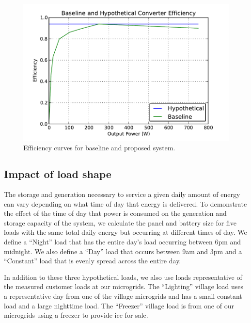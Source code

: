 \documentclass[conference]{IEEEtran}
\begin{document}
\begin{figure}[]
\begin{center}
\includegraphics[width=\columnwidth]{figures/inverter_curves.pdf}
\end{center}
\caption{Efficiency curves for baseline and proposed system.}
\label{inverter_curves}
\end{figure}

\subsection{Impact of load shape}

The storage and generation necessary to service a given daily
amount of energy can vary depending on what time of day
that energy is delivered.
To demonstrate the effect of the time of day that power
is consumed on the generation and storage capacity of the system,
we calculate the panel and battery size for five loads with
the same total daily energy but occurring at different times of day.
We define a ``Night'' load that has the entire day's load
occurring between 6pm and midnight.
We also define a ``Day'' load that occurs between 9am and 3pm
and a ``Constant'' load that is evenly spread across the entire day.

In addition to these three hypothetical loads, we also use loads
representative of the measured customer loads at our microgrids.
The ``Lighting'' village load uses a representative day from one of the
village microgrids and has a small constant load and a large
nighttime load.
The ``Freezer'' village load is from one of our microgrids using a freezer
to provide ice for sale.
\end{document}
